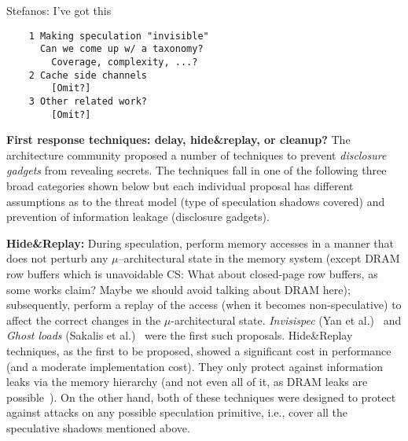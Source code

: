 {\color{red} Stefanos: I've got this}
\begin{verbatim}
    1 Making speculation "invisible"
      Can we come up w/ a taxonomy?
        Coverage, complexity, ...?
    2 Cache side channels 
        [Omit?]
    3 Other related work?
        [Omit?]
\end{verbatim}

\noindent \textbf{First response techniques: delay, hide\&replay, or cleanup?}
The architecture community proposed a number of techniques to prevent \emph{disclosure gadgets} from revealing secrets. The techniques fall in one of the following three broad categories shown below but each individual proposal has different assumptions as to the threat model (type of speculation shadows covered) and prevention of information leakage (disclosure gadgets).
\squishlist
\item{\textbf{Hide\&Replay:}} During speculation, perform memory accesses in a manner that does not perturb any $\mu$--architectural state in the memory system (except DRAM row buffers which is unavoidable {\color{blue}CS: What about closed-page row buffers, as some works claim? Maybe we should avoid talking about DRAM here}); subsequently, perform a replay of the access (when it becomes non-speculative) to affect the correct changes in the $\mu$-architectural state. \emph{Invisispec} (Yan et al.)~\cite{yan_invisispec:MICRO2018} and \emph{Ghost loads} (Sakalis et al.)~\cite{sakalis+:CF2019ghost} were the first such proposals. 
Hide\&Replay techniques, as the first to be proposed, showed a significant cost in performance (and a moderate implementation cost). They only protect against information leaks via the memory hierarchy (and not even all of it, as DRAM leaks are possible~\cite{pessl2016drama}). On the other hand, both of these techniques were designed to protect against attacks on any possible speculation primitive, i.e., cover all the speculative shadows mentioned above. 
